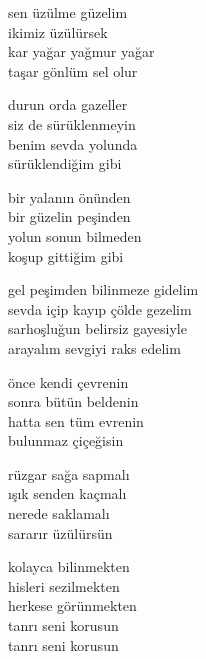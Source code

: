 \documentclass[10pt, openright, oneside]{memoir}
\theoremstyle{definition}
\begin{document}
\vspace*{\fill}
%
\newpage
{}
\vspace*{\fill}
\settowidth{\versewidth}{kar yağar yağmur yağar}
\begin{cverse}
  sen üzülme güzelim \\
  ikimiz üzülürsek \\
  kar yağar yağmur yağar \\
  taşar gönlüm sel olur
\end{cverse}
\vspace*{\fill}
%
\newpage
{}
\vspace*{\fill}
\settowidth{\versewidth}{siz de sürüklenmeyin}
\begin{cverse}
  durun orda gazeller \\
  siz de sürüklenmeyin \\
  benim sevda yolunda \\
  sürüklendiğim gibi

  bir yalanın önünden \\
  bir güzelin peşinden \\
  yolun sonun bilmeden \\
  koşup gittiğim gibi
\end{cverse}
\vspace*{\fill}
%
\newpage
{}
\vspace*{\fill}
\settowidth{\versewidth}{gel peşimden bilinmeze gidelim}
\begin{cverse}
  gel peşimden bilinmeze gidelim \\
  sevda içip kayıp çölde gezelim \\
  sarhoşluğun belirsiz gayesiyle \\
  arayalım sevgiyi raks edelim
\end{cverse}
\vspace*{\fill}
%
\newpage
{}
\vspace*{\fill}
\settowidth{\versewidth}{hatta sen tüm evrenin}
\begin{cverse}
  önce kendi çevrenin \\
  sonra bütün beldenin \\
  hatta sen tüm evrenin \\
  bulunmaz çiçeğisin

  rüzgar sağa sapmalı \\
  ışık senden kaçmalı \\
  nerede saklamalı \\
  sararır üzülürsün

  kolayca bilinmekten \\
  hisleri sezilmekten \\
  herkese görünmekten \\
  tanrı seni korusun \\
  tanrı seni korusun
\end{cverse}
\end{document}
